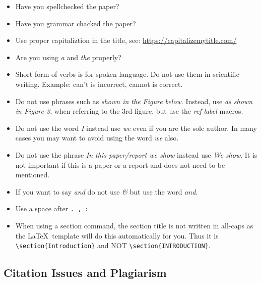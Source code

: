 \begin{itemize}[label=$\Box$]
    \item Have you spellchecked the paper?
    \item Have you grammar chacked the paper?
    \item Use proper capitaliztion in the title, see: \url{https://capitalizemytitle.com/}
     \item Are you using \textit{a} and \textit{the} properly?
    \item Short form of verbs is for spoken language. Do not use them
      in scientific writing. Example: can't is incorrect, cannot is correct.
    \item Do not use phrases such as \textit{shown in the Figure
        below}. Instead, use \textit{as shown in Figure 3}, when
      referring to the 3rd figure, but use the \textit{ref} \textit{label}
      macros.
    \item Do not use the word \textit{I} instead use \textit{we} even if you
      are the sole author. In many cases you may want to avoid using
      the word \textit{we} also.
    \item Do not use the phrase \textit{In this paper/report we show}
      instead use \textit{We show}. It is not important if this is a
      paper or a report and does not need to be mentioned. 
    \item If you want to say \textit{and} do not use \textit{\&} but use the
      word \textit{and}.
    \item Use a space after \verb|. , :|
    \item When using a section command, the section title is not
      written in all-caps as the \LaTeX~template will do this
      automatically for you. Thus it is \verb|\section{Introduction}|
      and NOT \verb|\section{INTRODUCTION}|.

\end{itemize}

\subsection{Citation Issues and Plagiarism}

